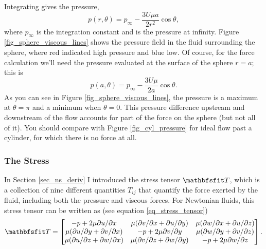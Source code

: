 Integrating gives the pressure,
\begin{equation}
\label{eq_sphere_slow_p}
\boxed{
p(r, \theta) = p_\infty - \frac{3U \mu a}{2r^2} \cos \theta,
}
\end{equation}
where $p_\infty$ is the integration constant and is the pressure at infinity.  Figure \ref{fig_sphere_viscous_lines} shows the pressure field in the fluid surrounding the sphere, where red indicated high pressure and blue low.  Of course, for the force calculation we'll need the pressure evaluated at the surface of the sphere $r=a$; this is
\begin{equation}
\label{eq_sphere_p_a}
p(a, \theta) = p_\infty -\frac{3U\mu}{2a} \cos \theta.
\end{equation}
As you can see in Figure \ref{fig_sphere_viscous_lines}, the pressure is a maximum at $\theta = \pi$ and a minimum when $\theta = 0$.  This pressure difference upstream and downstream of the flow accounts for part of the force on the sphere (but not all of it).  You should compare with Figure \ref{fig_cyl_pressure} for ideal flow past a cylinder, for which there is no force at all.

\subsubsection{The Stress}

In Section \ref{sec_ns_deriv} I introduced the stress tensor $\tens{T}$, which is a collection of nine different quantities $T_{ij}$ that quantify the force exerted by the fluid, including both the pressure and viscous forces.  For Newtonian fluids, this stress tensor can be written as (see equation \ref{eq_stress_tensor})
\[
\tens{T} = \begin{bmatrix}
- p + 2 \mu \partial u / \partial x  &  \mu (\partial v / \partial x + \partial u / \partial y)  &   \mu (\partial w / \partial x + \partial u / \partial z) \\
\mu (\partial u / \partial y + \partial v / \partial x)  & -p + 2\mu  \partial v / \partial y  &  \mu (\partial w / \partial y + \partial v / \partial z) \\
\mu (\partial u / \partial z + \partial w / \partial x)  &  \mu (\partial v / \partial z + \partial w / \partial y) & -p + 2\mu  \partial w / \partial z
\end{bmatrix}.
\]

